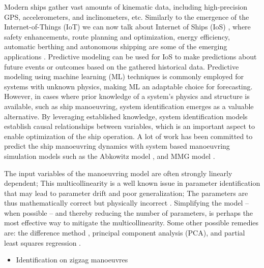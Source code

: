 Modern ships gather vast amounts of kinematic data, including high-precision GPS, accelerometers, and inclinometers, etc. Similarly to the emergence of the Internet-of-Things (IoT) we can now talk about Internet of Ships (IoS) \citep{liu_internet_2016}, where safety enhancements, route planning and optimization, energy efficiency, automatic berthing and autonomous shipping are some of the emerging applications \citep{aslam_internet_2020}.
Predictive modeling can be used for IoS to make predictions about future events or outcomes based on the gathered historical data.
Predictive modeling using machine learning (ML) techniques is commonly employed for systems with unknown physics, making ML an adaptable choice for forecasting. However, in cases where prior knowledge of a system's physics and structure is available, such as ship manoeuvring, system identification emerges as a valuable alternative. By leveraging established knowledge, system identification models establish causal relationships between variables, which is an important aspect to enable optimization of the ship operation.
A lot of work has been committed to predict the ship manoeuvring dynamics with system based manoeuvring simulation models such as the Abkowitz model \citep{abkowitz_ship_1964}, and MMG model \citep{yasukawa_introduction_2015}. 


The input variables of the manoeuvring model are often strongly linearly dependent; This multicollinearity is a well known issue in parameter identification that may lead to parameter drift and poor generalization; The parameters are thus mathematically correct but physically incorrect \citep{luo_parameter_2016}. 
Simplifying the model -- when possible -- and thereby reducing the number of parameters, is perhaps the most effective way to mitigate the multicollinearity.
Some other possible remedies are: the difference method \citep{luo_parameter_2016}, principal component analysis (PCA), and partial least squares regression \citep{jian-chuan_parametric_2015}. 

\begin{itemize}
    \item Identification on zigzag manoeuvres
\end{itemize}

